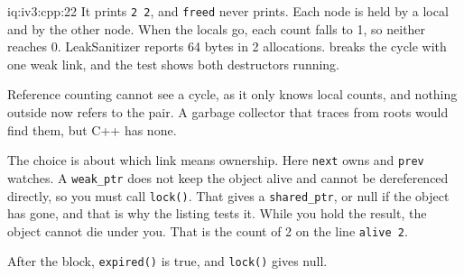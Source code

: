 \begin{solution}{iq:iv3:cpp:22}
It prints \texttt{2 2}, and \texttt{freed} never prints. Each node is held by a local and by the other node. When the locals go, each count falls to 1, so neither reaches 0. LeakSanitizer reports 64 bytes in 2 allocations.  breaks the cycle with one weak link, and the test shows both destructors running.
\label{lst:iv3:cp:cyclefixed}

Reference counting cannot see a cycle, as it only knows local counts, and nothing outside now refers to the pair. A garbage collector that traces from roots would find them, but C++ has none.

The choice is about which link means ownership. Here \texttt{next} owns and \texttt{prev} watches. A \texttt{weak\_ptr} does not keep the object alive and cannot be dereferenced directly, so you must call \texttt{lock()}. That gives a \texttt{shared\_ptr}, or null if the object has gone, and that is why the listing tests it. While you hold the result, the object cannot die under you. That is the count of 2 on the line \texttt{alive 2}.

After the block, \texttt{expired()} is true, and \texttt{lock()} gives null.

\end{solution}

